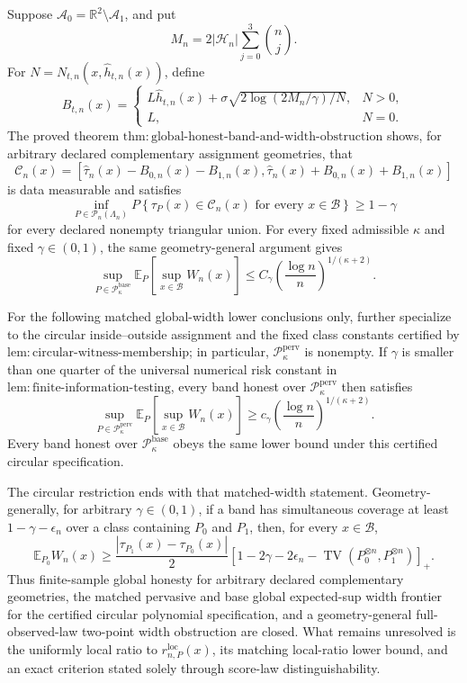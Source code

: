 Suppose \(\mathcal A_0=\mathbb R^2\setminus\mathcal A_1\), and put
\[
 M_n=2|\mathcal H_n|\sum_{j=0}^3\binom nj.
\]
For \(N=N_{t,n}(x,\widehat h_{t,n}(x))\), define
\[
 B_{t,n}(x)=
 \begin{cases}
 L\widehat h_{t,n}(x)+\sigma\sqrt{2\log(2M_n/\gamma)/N},&N>0,\\
 L,&N=0.
 \end{cases}
\]
The proved theorem \(\mathrm{thm:global\text{-}honest\text{-}band\text{-}and\text{-}width\text{-}obstruction}\) shows, for arbitrary declared complementary assignment geometries, that
\[
 \mathcal C_n(x)=
 \left[\widehat\tau_n(x)-B_{0,n}(x)-B_{1,n}(x),
 \widehat\tau_n(x)+B_{0,n}(x)+B_{1,n}(x)\right]
\]
is data measurable and satisfies
\[
 \inf_{P\in\mathcal P_n(\Lambda_n)}
 P\!\left\{\tau_P(x)\in\mathcal C_n(x)
 \text{ for every }x\in\mathcal B\right\}\ge 1-\gamma
\]
for every declared nonempty triangular union. For every fixed admissible \(\kappa\) and fixed \(\gamma\in(0,1)\), the same geometry-general argument gives
\[
 \sup_{P\in\mathcal P_{\kappa}^{\mathrm{base}}}
 \mathbb E_P\!\left[\sup_{x\in\mathcal B}W_n(x)\right]
 \le C_\gamma\left(\frac{\log n}{n}\right)^{1/(\kappa+2)}.
\]

For the following matched global-width lower conclusions only, further specialize to the circular inside--outside assignment and the fixed class constants certified by \(\mathrm{lem:circular\text{-}witness\text{-}membership}\); in particular, \(\mathcal P_{\kappa}^{\mathrm{perv}}\) is nonempty. If \(\gamma\) is smaller than one quarter of the universal numerical risk constant in \(\mathrm{lem:finite\text{-}information\text{-}testing}\), every band honest over \(\mathcal P_{\kappa}^{\mathrm{perv}}\) then satisfies
\[
 \sup_{P\in\mathcal P_{\kappa}^{\mathrm{perv}}}
 \mathbb E_P\!\left[\sup_{x\in\mathcal B}W_n(x)\right]
 \ge c_\gamma\left(\frac{\log n}{n}\right)^{1/(\kappa+2)}.
\]
Every band honest over \(\mathcal P_{\kappa}^{\mathrm{base}}\) obeys the same lower bound under this certified circular specification.

The circular restriction ends with that matched-width statement. Geometry-generally, for arbitrary \(\gamma\in(0,1)\), if a band has simultaneous coverage at least \(1-\gamma-\epsilon_n\) over a class containing \(P_0\) and \(P_1\), then, for every \(x\in\mathcal B\),
\[
 \mathbb E_{P_0}W_n(x)\ge
 \frac{|\tau_{P_1}(x)-\tau_{P_0}(x)|}{2}
 \left[1-2\gamma-2\epsilon_n-
 \operatorname{TV}(P_0^{\otimes n},P_1^{\otimes n})\right]_+.
\]
Thus finite-sample global honesty for arbitrary declared complementary geometries, the matched pervasive and base global expected-sup width frontier for the certified circular polynomial specification, and a geometry-general full-observed-law two-point width obstruction are closed. What remains unresolved is the uniformly local ratio to \(r_{n,P}^{\mathrm{loc}}(x)\), its matching local-ratio lower bound, and an exact criterion stated solely through score-law distinguishability.